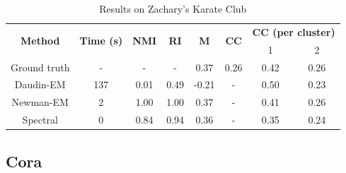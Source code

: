 \documentclass[switch, 12pt]{article}
\begin{document}
\begin{table}[h]
    \centering
    \setlength\heavyrulewidth{0.25ex}
    \begin{tabular}{@{}cccccccc@{}}
        \toprule
        \multirow{2}{*}{\textbf{Method}}  & \multirow{2}{*}{\textbf{Time (s)}} & \multirow{2}{*}{\textbf{NMI}} & \multirow{2}{*}{\textbf{RI}} & \multirow{2}{*}{\textbf{M}} & \multirow{2}{*}{\textbf{CC}} & \multicolumn{2}{c}{\textbf{CC (per cluster)}}        \\
                                          &                                    &                               &                              &                             &                              & 1                                             & 2    \\ \midrule
        \multicolumn{1}{c|}{Ground truth} & \multicolumn{1}{c|}{-}             & -                             & \multicolumn{1}{c|}{-}       & 0.37                        & 0.26                         & 0.42                                          & 0.26 \\
        \multicolumn{1}{c|}{Daudin-EM}    & \multicolumn{1}{c|}{137}           & 0.01                          & \multicolumn{1}{c|}{0.49}    & -0.21                       & -                            & 0.50                                          & 0.23 \\
        \multicolumn{1}{c|}{Newman-EM}    & \multicolumn{1}{c|}{2}             & 1.00                          & \multicolumn{1}{c|}{1.00}    & 0.37                        & -                            & 0.41                                          & 0.26 \\
        \multicolumn{1}{c|}{Spectral}     & \multicolumn{1}{c|}{0}             & 0.84                          & \multicolumn{1}{c|}{0.94}    & 0.36                        & -                            & 0.35                                          & 0.24 \\ \bottomrule
    \end{tabular}
    \caption{Results on Zachary’s Karate Club}
    \label{tab:zachary_results}
\end{table}

\newpage

\subsection{Cora}
\label{app:cora}

\end{document}
